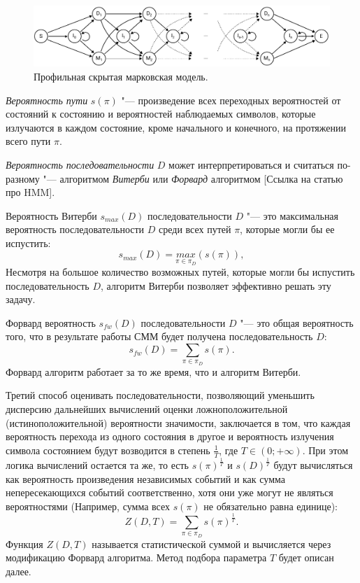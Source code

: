 \documentclass[]{article}
\begin{document}
			\begin{figure}[h]
				\includegraphics[width=15cm]{figure2}
				\centering
				\caption{Профильная скрытая марковская модель.}
			\end{figure}
			
			\textit{Вероятность пути} $s(\pi)$ "--- произведение всех переходных вероятностей от состояний к состоянию и вероятностей наблюдаемых символов, которые излучаются в каждом состояние, кроме начального и конечного, на протяжении всего пути $\pi$. 
			
			\textit{Вероятность последовательности} $D$ может интерпретироваться и считаться по-разному "--- алгоритмом \textit{Витерби} или \textit{Форвард} алгоритмом [Ссылка на статью про HMM].
			
			Вероятность Витерби $s_{max}(D)$ последовательности $D$ "--- это максимальная вероятность последовательности $D$ среди всех путей $\pi$, которые могли бы ее испустить:
			\begin{equation}
				s_{max}(D) = \underset{\pi \in \pi_{D}}{max}(s(\pi)),
			\end{equation}
			Несмотря на большое количество возможных путей, которые могли бы испустить последовательность $D$, алгоритм Витерби позволяет эффективно решать эту задачу.
			
			Форвард вероятность $s_{fw}(D)$ последовательности $D$ "--- это общая вероятность того, что в результате работы СММ будет получена последовательность $D$:
			\begin{equation}
				s_{fw}(D) = \sum_{\pi \in \pi_{D}}s(\pi).
			\end{equation}
			Форвард алгоритм работает за то же время, что и алгоритм Витерби.
			
			Третий способ оценивать последовательности, позволяющий уменьшить дисперсию дальнейших вычислений оценки ложноположительной (истиноположительной) вероятности значимости, заключается в том, что каждая вероятность перехода из одного состояния в другое и вероятность излучения символа состоянием будут возводится в степень $\frac{1}{T}$, где $T \in (0; +\infty)$. При этом логика вычислений остается та же, то есть $s(\pi)^{\frac{1}{T}}$ и $s(D)^{\frac{1}{T}}$ будут вычисляться как вероятность произведения независимых событий и как сумма непересекающихся событий соответственно, хотя они уже могут не являться вероятностями (Например, сумма всех $s(\pi)$ не обязательно равна единице):
			\begin{equation}
				Z(D, T)	= \sum_{\pi \in \pi_{D}}s(\pi)^{\frac{1}{T}}.
			\end{equation}		
			Функция $Z(D, T)$ называется статистической суммой и вычисляется через модификацию Форвард алгоритма. Метод подбора параметра $T$ будет описан далее.
			
\end{document}
